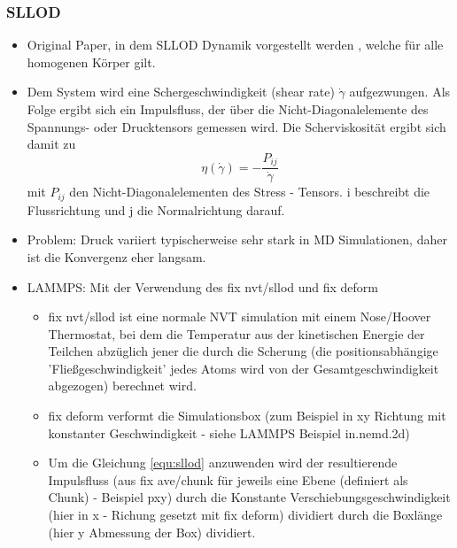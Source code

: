 \documentclass[a4paper, 10pt, 
               numbers=noenddot, toc=graduated,
               headsepline=true, footsepline=true,
               twoside=false, titlepage=true, 
               bibliography=totoc]{scrartcl}
\begin{document}
	\subsubsection{SLLOD}
		\begin{itemize}
		 	\item Original Paper, in dem SLLOD Dynamik vorgestellt werden \cite{Evans1984}, welche für alle homogenen Körper gilt.
		 	\item Dem System wird eine Schergeschwindigkeit (shear rate) $\dot{\gamma}$ aufgezwungen. Als Folge ergibt sich ein Impulsfluss, der über die Nicht-Diagonalelemente des Spannungs- oder Drucktensors gemessen wird\cite{Tenney2010}. Die Scherviskosität ergibt sich damit zu 
				\begin{equation}
					\eta\left(\dot{\gamma}\right) = - \frac{P_{ij}}{\dot{\gamma}}
					\label{equ:sllod}
				\end{equation}
 mit $P_{ij}$ den Nicht-Diagonalelementen des Stress - Tensors. i beschreibt die Flussrichtung und j die Normalrichtung darauf. 
		 	\item Problem: Druck variiert typischerweise sehr stark in MD Simulationen, daher ist die Konvergenz eher langsam\cite{Tenney2010}.
		 	\item LAMMPS: Mit der Verwendung des fix nvt/sllod und fix deform 
				\begin{itemize}
					\item fix nvt/sllod ist eine normale NVT simulation mit einem Nose/Hoover Thermostat, bei dem die Temperatur aus der kinetischen Energie der Teilchen abzüglich jener die durch die Scherung (die positionsabhängige 'Fließgeschwindigkeit' jedes Atoms wird von der Gesamtgeschwindigkeit abgezogen) berechnet wird.
					\item fix deform verformt die Simulationsbox (zum Beispiel in xy Richtung mit konstanter Geschwindigkeit - siehe LAMMPS Beispiel in.nemd.2d)
					\item Um die Gleichung \ref{equ:sllod} anzuwenden wird der resultierende Impulsfluss (aus fix ave/chunk für jeweils eine Ebene (definiert als Chunk) - Beispiel pxy) durch die Konstante Verschiebungsgeschwindigkeit (hier in x - Richung gesetzt mit fix deform) dividiert durch die Boxlänge (hier y Abmessung der Box) dividiert. 
				\end{itemize}
		\end{itemize}
		
\end{document}
